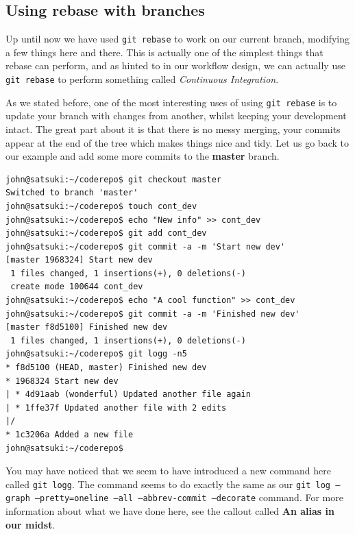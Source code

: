 \subsection{Using rebase with branches}

Up until now we have used \texttt{git rebase} to work on our current branch, modifying a few things here and there.
This is actually one of the simplest things that rebase can perform, and as hinted to in our workflow design, we can actually use \texttt{git rebase} to perform something called \emph{Continuous Integration}.

As we stated before, one of the most interesting uses of using \texttt{git rebase} is to update your branch with changes from another, whilst keeping your development intact.
The great part about it is that there is no messy merging, your commits appear at the end of the tree which makes things nice and tidy.
Let us go back to our example and add some more commits to the \textbf{master} branch.

\begin{Verbatim}
john@satsuki:~/coderepo$ git checkout master
Switched to branch 'master'
john@satsuki:~/coderepo$ touch cont_dev
john@satsuki:~/coderepo$ echo "New info" >> cont_dev
john@satsuki:~/coderepo$ git add cont_dev
john@satsuki:~/coderepo$ git commit -a -m 'Start new dev'
[master 1968324] Start new dev
 1 files changed, 1 insertions(+), 0 deletions(-)
 create mode 100644 cont_dev
john@satsuki:~/coderepo$ echo "A cool function" >> cont_dev
john@satsuki:~/coderepo$ git commit -a -m 'Finished new dev'
[master f8d5100] Finished new dev
 1 files changed, 1 insertions(+), 0 deletions(-)
john@satsuki:~/coderepo$ git logg -n5
* f8d5100 (HEAD, master) Finished new dev
* 1968324 Start new dev
| * 4d91aab (wonderful) Updated another file again
| * 1ffe37f Updated another file with 2 edits
|/
* 1c3206a Added a new file
john@satsuki:~/coderepo$
\end{Verbatim}

You may have noticed that we seem to have introduced a new command here called \texttt{git logg}.
The command seems to do exactly the same as our \texttt{git log --graph --pretty=oneline --all --abbrev-commit --decorate} command.
For more information about what we have done here, see the callout called \textbf{An alias in our midst}.

